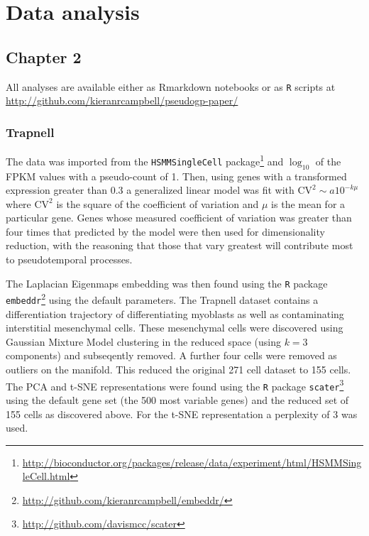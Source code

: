 \chapter{Data analysis}

\section{Chapter 2} \label{app:pseudogp_data_analysis}

All analyses are available either as Rmarkdown notebooks or as \texttt{R} scripts at \url{http://github.com/kieranrcampbell/pseudogp-paper/}

\subsection{Trapnell}
The data was imported from the \texttt{HSMMSingleCell} package\footnote{\url{http://bioconductor.org/packages/release/data/experiment/html/HSMMSingleCell.html}} and $\log_{10}$ of the FPKM values with a pseudo-count of 1. Then, using genes with a transformed expression greater than 0.3 a generalized linear model was fit with $\mathrm{CV}^2 \sim a 10^{-k\mu}$ where $\mathrm{CV}^2$ is the square of the coefficient of variation and $\mu$ is the mean for a particular gene. Genes whose measured coefficient of variation was greater than four times that predicted by the model were then used for dimensionality reduction, with the reasoning that those that vary greatest will contribute most to pseudotemporal processes.

The Laplacian Eigenmaps embedding was then found using the \texttt{R} package \texttt{embeddr}\footnote{\url{http://github.com/kieranrcampbell/embeddr/}} using the default parameters. The Trapnell dataset contains a differentiation trajectory of differentiating myoblasts as well as contaminating interstitial mesenchymal cells. These mesenchymal cells were discovered using Gaussian Mixture Model clustering in the reduced space (using $k=3$ components) and subseqently removed. A further four cells were removed as outliers on the manifold. This reduced the original 271 cell dataset to 155 cells. The PCA and t-SNE representations were found using the \texttt{R} package \texttt{scater}\footnote{\url{http://github.com/davismcc/scater}} using the default gene set (the 500 most variable genes) and the reduced set of 155 cells as discovered above. For the t-SNE representation a perplexity of 3 was used.

